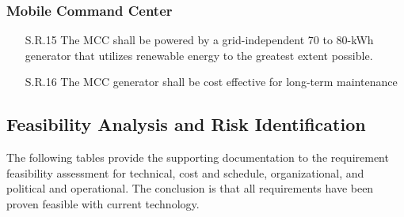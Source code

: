 \begin{fullwidth}
    \subsubsection*{Mobile Command Center}
    \begin{enumerate}
        \item[S.R.15]{The MCC shall be powered by a grid-independent 70 to 80-kWh generator that utilizes renewable energy to the greatest extent possible.}
        \item[S.R.16]{The MCC generator shall be cost effective for long-term maintenance}
    \end{enumerate}

\subsection{Feasibility Analysis and Risk Identification}
    The following tables provide the supporting documentation to the requirement feasibility assessment for technical, cost and schedule, organizational, and political and operational. The conclusion is that all requirements have been proven feasible with current technology.
    
    \begin{landscape}
    
    
    
        

\end{landscape}
\end{fullwidth}
